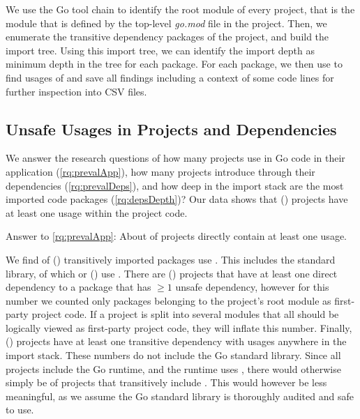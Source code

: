 We use the Go tool chain to identify the root module of every project, that is the module that is defined by the top-level \textit{go.mod} file in the project.
Then, we enumerate the transitive dependency packages of the project, and build the import tree. Using this import tree, we can identify the import depth as minimum depth in the tree for each package.
For each package, we then use \toolUsage{} to find usages of \unsafe{} and save all findings including a context of some code lines for further inspection into CSV files.


\subsection{Unsafe Usages in Projects and Dependencies}

We answer the research questions of how many projects use \unsafe{} in Go code in their application (\ref{rq:prevalApp}), how many projects introduce \unsafe{} through their dependencies (\ref{rq:prevalDeps}), and how deep in the import stack are the most imported \unsafe{} code packages (\ref{rq:depsDepth})?
Our data shows that   () projects have at least one \unsafe{} usage within the project code.

\begin{tcolorbox}
Answer to \ref{rq:prevalApp}: About  of projects directly contain at least one \unsafe{} usage.
\end{tcolorbox}

We find  of  () transitively imported packages use \unsafe{}. This includes the standard library, of which  or  () use \unsafe{}.
There are  () projects that have at least one direct dependency to a package that has $\geq 1$ unsafe dependency, however for this number we counted only packages belonging to the project's root module as first-party project code. 
If a project is split into several modules that all should be logically viewed as first-party project code, they will inflate this number.
Finally,  () projects have at least one transitive dependency with \unsafe{} usages anywhere in the import stack.
These numbers do not include the Go standard library.
Since all projects include the Go runtime, and the runtime uses \unsafe{}, there would otherwise simply be  of projects that transitively include \unsafe{}.
This would however be less meaningful, as we assume the Go standard library is thoroughly audited and safe to use.

